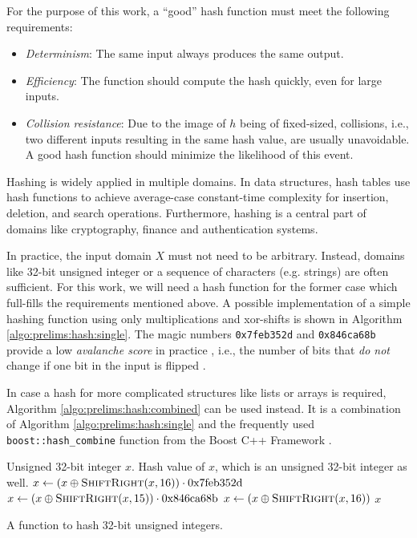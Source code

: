 		For the purpose of this work, a \enquote{good} hash function must meet the following requirements:

		\begin{itemize}
			\item \textit{Determinism}: The same input always produces the same output.
			\item \textit{Efficiency}: The function should compute the hash quickly, even for large inputs.
			\item \textit{Collision resistance}: Due to the image of $h$ being of fixed-sized, collisions, i.e., two different inputs resulting in the same hash value, are usually unavoidable. A good hash function should minimize the likelihood of this event.
		\end{itemize}

		Hashing is widely applied in multiple domains. In data structures, hash tables use hash functions to achieve average-case constant-time complexity for insertion, deletion, and search operations.
		Furthermore, hashing is a central part of domains like cryptography, finance and authentication systems. 

		In practice, the input domain $X$ must not need to be arbitrary. Instead, domains like 32-bit unsigned integer or a sequence of characters (e.g. strings) are often sufficient.
		For this work, we will need a hash function for the former case which full-fills the requirements mentioned above.
		A possible implementation of a simple hashing function using only multiplications and xor-shifts is shown in Algorithm \ref{algo:prelims:hash:single}.
		The magic numbers \lstinline|0x7feb352d| and \lstinline|0x846ca68b| provide a low \textit{avalanche score} in practice \cite{christopherwellonsHashFunctionProspector2025}, i.e., the number of bits that \textit{do not} change if one bit in the input is flipped \cite{9923931}.

		In case a hash for more complicated structures like lists or arrays is required, Algorithm \ref{algo:prelims:hash:combined} can be used instead.
		It is a combination of Algorithm \ref{algo:prelims:hash:single} and the frequently used \lstinline|boost::hash_combine| function from the Boost C++ Framework \cite{boostBoostLibraries}.

		\begin{algorithm}[ht!]
				\centering
			\begin{algorithmic}
				\Require Unsigned 32-bit integer $x$.
				\Ensure Hash value of $x$, which is an unsigned 32-bit integer as well.
				\Statex
					\State $x \gets (x \oplus \Call{ShiftRight}{x, 16}) \cdot \mathrm{0x7feb352d}$
					\State $x \gets (x \oplus \Call{ShiftRight}{x, 15}) \cdot \mathrm{0x846ca68b}$
					\State $x \gets (x \oplus \Call{ShiftRight}{x, 16})$
					\State \Return $x$
				\EndFunction
			\end{algorithmic}
			\caption{A function to hash 32-bit unsigned integers.}
			\label{algo:prelims:hash:single}
		\end{algorithm}

